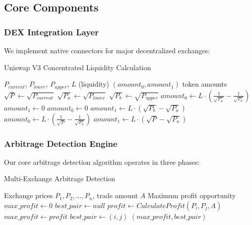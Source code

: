 \documentclass[12pt]{article}
\begin{document}
\subsection{Core Components}

\subsubsection{DEX Integration Layer}
We implement native connectors for major decentralized exchanges:

\begin{algorithm}
\caption{Uniswap V3 Concentrated Liquidity Calculation}
\label{alg:uniswap_v3}
\begin{algorithmic}[1]
\REQUIRE $P_{current}$, $P_{lower}$, $P_{upper}$, $L$ (liquidity)
\ENSURE $(amount_0, amount_1)$ token amounts
\STATE $\sqrt{P} \leftarrow \sqrt{P_{current}}$
\STATE $\sqrt{P_a} \leftarrow \sqrt{P_{lower}}$
\STATE $\sqrt{P_b} \leftarrow \sqrt{P_{upper}}$
    \STATE $amount_0 \leftarrow L \cdot (\frac{1}{\sqrt{P_a}} - \frac{1}{\sqrt{P_b}})$
    \STATE $amount_1 \leftarrow 0$
    \STATE $amount_0 \leftarrow 0$
    \STATE $amount_1 \leftarrow L \cdot (\sqrt{P_b} - \sqrt{P_a})$
\ELSE
    \STATE $amount_0 \leftarrow L \cdot (\frac{1}{\sqrt{P}} - \frac{1}{\sqrt{P_b}})$
    \STATE $amount_1 \leftarrow L \cdot (\sqrt{P} - \sqrt{P_a})$
\ENDIF
\end{algorithmic}
\end{algorithm}

\subsubsection{Arbitrage Detection Engine}

Our core arbitrage detection algorithm operates in three phases:

\begin{algorithm}
\caption{Multi-Exchange Arbitrage Detection}
\label{alg:arbitrage_detection}
\begin{algorithmic}[1]
\REQUIRE Exchange prices $P_1, P_2, \ldots, P_n$, trade amount $A$
\ENSURE Maximum profit opportunity
\STATE $max\_profit \leftarrow 0$
\STATE $best\_pair \leftarrow null$
        \STATE $profit \leftarrow CalculateProfit(P_i, P_j, A)$
            \STATE $max\_profit \leftarrow profit$
            \STATE $best\_pair \leftarrow (i, j)$
        \ENDIF
    \ENDFOR
\ENDFOR
\RETURN $(max\_profit, best\_pair)$
\end{algorithmic}
\end{algorithm}
\end{document}
